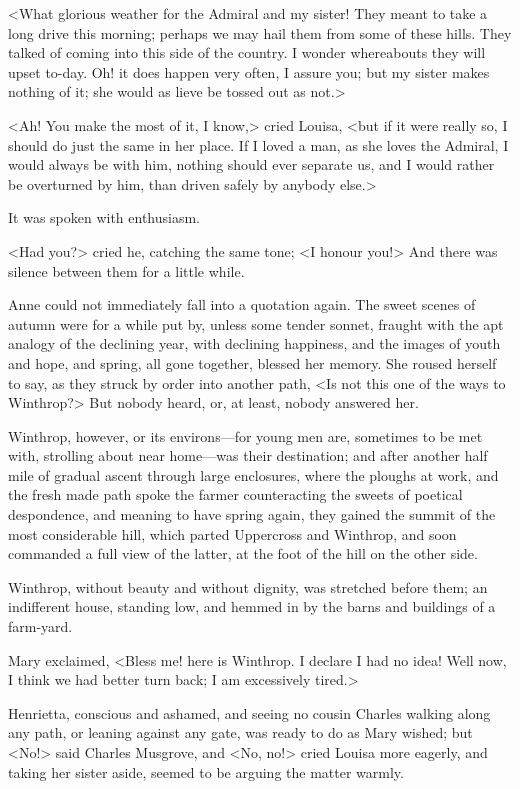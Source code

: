 <What glorious weather for the Admiral and my sister! They meant to take a long drive this morning; perhaps we may hail them from some of these hills. They talked of coming into this side of the country. I wonder whereabouts they will upset to-day. Oh! it does happen very often, I assure you; but my sister makes nothing of it; she would as lieve be tossed out as not.>

<Ah! You make the most of it, I know,> cried Louisa, <but if it were really so, I should do just the same in her place. If I loved a man, as she loves the Admiral, I would always be with him, nothing should ever separate us, and I would rather be overturned by him, than driven safely by anybody else.>

It was spoken with enthusiasm.

<Had you?> cried he, catching the same tone; <I honour you!> And there was silence between them for a little while.

Anne could not immediately fall into a quotation again. The sweet scenes of autumn were for a while put by, unless some tender sonnet, fraught with the apt analogy of the declining year, with declining happiness, and the images of youth and hope, and spring, all gone together, blessed her memory. She roused herself to say, as they struck by order into another path, <Is not this one of the ways to Winthrop?> But nobody heard, or, at least, nobody answered her.

Winthrop, however, or its environs—for young men are, sometimes to be met with, strolling about near home—was their destination; and after another half mile of gradual ascent through large enclosures, where the ploughs at work, and the fresh made path spoke the farmer counteracting the sweets of poetical despondence, and meaning to have spring again, they gained the summit of the most considerable hill, which parted Uppercross and Winthrop, and soon commanded a full view of the latter, at the foot of the hill on the other side.

Winthrop, without beauty and without dignity, was stretched before them; an indifferent house, standing low, and hemmed in by the barns and buildings of a farm-yard.

Mary exclaimed, <Bless me! here is Winthrop. I declare I had no idea! Well now, I think we had better turn back; I am excessively tired.>

Henrietta, conscious and ashamed, and seeing no cousin Charles walking along any path, or leaning against any gate, was ready to do as Mary wished; but <No!> said Charles Musgrove, and <No, no!> cried Louisa more eagerly, and taking her sister aside, seemed to be arguing the matter warmly.


